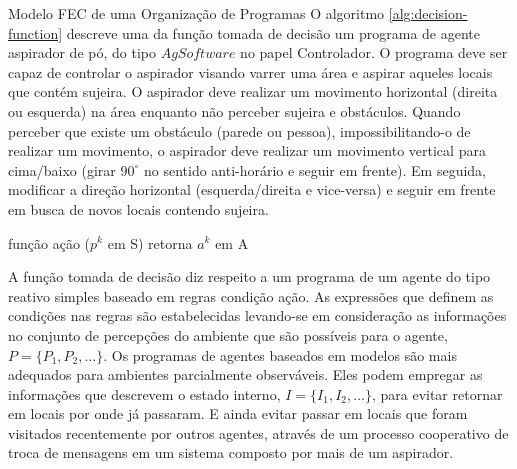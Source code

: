 \begin{section}{Modelo FEC de uma Organização de Programas}
        O algoritmo \ref{alg:decision-function} descreve uma da função tomada de decisão um programa de agente aspirador de pó, do tipo $AgSoftware$ no papel Controlador. O programa deve ser capaz de controlar o aspirador visando varrer uma área e aspirar aqueles locais que contém sujeira. O aspirador deve realizar um movimento horizontal (direita ou esquerda) na área enquanto não perceber sujeira e obstáculos. Quando perceber que existe um obstáculo (parede ou pessoa), impossibilitando-o de realizar um movimento, o aspirador deve realizar um movimento vertical para cima/baixo (girar $90^\circ$ no sentido anti-horário e seguir em frente). Em seguida, modificar a direção horizontal (esquerda/direita e vice-versa) e seguir em frente em busca de novos locais contendo sujeira.
        
        \begin{algorithm}[h!]
            \caption{\label{alg:decision-function} Descrição parcial da função tomada de decisão de um agente reativo.}
            função ação ($p^k$ em S) retorna $a^k$ em A\\
        \end{algorithm}
        
        A função tomada de decisão diz respeito a um programa de um agente do tipo reativo simples baseado em regras condição ação. As expressões que definem as condições nas regras são estabelecidas levando-se em consideração as informações no conjunto de percepções do ambiente que são possíveis para o agente, $P = \{P_1, P_2, \ldots \}$. Os programas de agentes baseados em modelos são mais adequados para ambientes parcialmente observáveis. Eles podem empregar as informações que descrevem o estado interno, $I = \{I_1, I_2, \ldots \}$, para evitar retornar em locais por onde já passaram. E ainda evitar passar em locais que foram visitados recentemente por outros agentes, através de um processo cooperativo de troca de mensagens em um sistema composto por mais de um aspirador.
    

\end{section}
